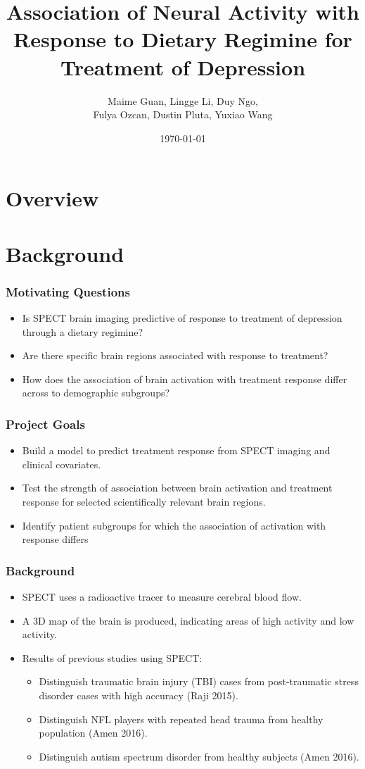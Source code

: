 \documentclass{beamer}
\title[]{Association of Neural Activity with Response to Dietary Regimine 
for Treatment of Depression} %
\author{Maime Guan, Lingge Li, Duy Ngo, \\Fulya Ozcan, Dustin Pluta, Yuxiao Wang} %
\institute[UCI] %
{
 \\ %
\medskip
\textit{} %
}
\date{\today} %
\begin{document}
\begin{frame}
\titlepage %
\end{frame}


\section*{Overview}

\begin{frame}
\tableofcontents
\end{frame}


\section{Background}

\begin{frame}
\frametitle{Motivating Questions}
\begin{itemize}
\item Is SPECT brain imaging predictive of response to treatment of depression through a dietary regimine?
\item Are there specific brain regions associated with response to treatment?
\item How does the association of brain activation with treatment response differ across to demographic subgroups?
\end{itemize}
\end{frame}


\begin{frame}
\frametitle{Project Goals}
\begin{itemize}
\item Build a model to predict treatment response from SPECT imaging and clinical covariates.
\item Test the strength of association between brain activation and treatment response for selected scientifically relevant brain regions.
\item Identify patient subgroups for which the association of activation with response differs
\end{itemize}
\end{frame}

\begin{frame}
\frametitle{Background}
\begin{itemize}
\item SPECT uses a radioactive tracer to measure cerebral blood flow.
\item A 3D map of the brain is produced, indicating areas of high activity and low activity.
\item Results of previous studies using SPECT:
\begin{itemize}
\item Distinguish traumatic brain injury (TBI) cases from post-traumatic stress disorder cases with high accuracy (Raji 2015).
\item Distinguish NFL players with repeated head trauma from healthy population (Amen 2016).
\item Distinguish autism spectrum disorder from healthy subjects (Amen 2016).
\end{itemize}
\end{itemize}
\end{frame}
\end{document}
